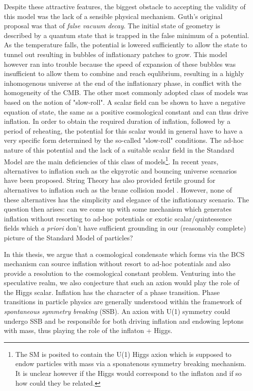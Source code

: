 \begin{doublespace}
Despite these attractive features, the biggest obstacle to accepting the validity of this model was the lack of a sensible physical mechanism. Guth's original proposal was that of \emph{false vacuum decay}. The initial state of geometry is described by a quantum state that is trapped in the false minimum of a potential. As the temperature falls, the potential is lowered sufficiently to allow the state to tunnel out resulting in bubbles of inflationary patches to grow. This model however ran into trouble because the speed of expansion of these bubbles was insufficient to allow them to combine and reach equlibrium, resulting in a highly inhomogenous universe at the end of the inflationary phase, in conflict with the homogeneity of the CMB. The other most commonly adopted class of models was based on the notion of "slow-roll". A scalar field can be shown to have a negative equation of state, the same as a positive cosmological constant and can thus drive inflation. In order to obtain the required duration of inflation, followed by a period of reheating, the potential for this scalar would in general have to have a very specific form determined by the so-called "slow-roll" conditions. The ad-hoc nature of this potential and the lack of a suitable scalar field in the Standard Model are the main deficiencies of this class of models\footnote{The SM is posited to contain the U(1) Higgs axion which is supposed to endow particles with mass via a sponatenous symmetry breaking mechanism. It is unclear however if the Higgs would correspond to the inflaton and if so how could they be related.}. In recent years, alternatives to inflation such as the ekpyrotic and bouncing universe scenarios have been proposed. String Theory has also provided fertile ground for alternatives to inflation such as the brane collision model \cite{Khoury2001Physical}. However, none of these alternatives has the simplicity and elegance of the inflationary scenario. The question then arises: can we come up with some mechanism which generates inflation without resorting to ad-hoc potentials or exotic scalar/quintessence fields which \emph{a priori} don't have sufficient grounding in our (reasonably complete) picture of the Standard Model of particles?

In this thesis, we argue that a cosmological condensate which forms via the BCS mechanism can source inflation without resort to ad-hoc potentials and also provide a resolution to the cosmological constant problem. Venturing into the speculative realm, we also conjecture that such an axion would play the role of the Higgs scalar. Inflation has the character of a phase transition. Phase transitions in particle physics are generally understood within the framework of \emph{spontaneous symmetry breaking} (SSB). An axion with U(1) symmetry could undergo SSB and be responsible for both driving inflation and endowing leptons with mass, thus playing the role of the inflaton + Higgs.


\end{doublespace}
